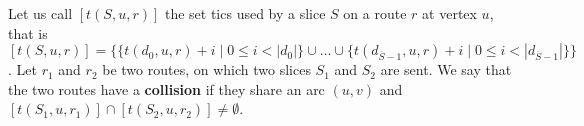 \documentclass[10pt]{article}
\begin{document}
     
       Let us call $[t(S,u,r)]$ the set tics used by a slice $S$ on a route $r$ at vertex $u$, that is $[t(S,u,r)] = \{ \{t(d_0,u,r) + i \mid 0 \leq i < |d_0|\} \cup \ldots \cup \{ t(d_{\overline S-1},u,r) + i  \mid 0 \leq i < |d_{\overline S-1}|\}  \}$.
      Let $r_1$ and $r_2$ be two routes, on which two slices $S_1$ and $S_2$ are sent.
      We say that the two routes have a {\bf collision} if they share an arc $(u,v)$ and $[t(S_1,u,r_{1})] \cap [t(S_2,u,r_{2})] \neq \emptyset$.
      
	 
\end{document}
